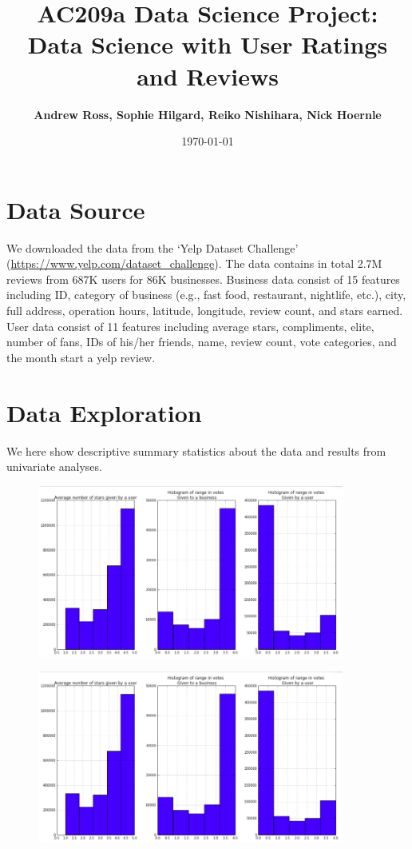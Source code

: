 \documentclass[11pt]{article}
\title{
\vspace{1cm}
\textmd{\textbf{AC209a Data Science Project: Data Science with User Ratings and Reviews}}\\
}
\author{\textbf{Andrew Ross, Sophie Hilgard, Reiko Nishihara, Nick Hoernle}}
\date{\today} %
\begin{document}
\maketitle

\section*{Data Source}
We downloaded the data from the `Yelp Dataset Challenge' (\url{https://www.yelp.com/dataset_challenge}). The data contains in total 2.7M reviews from 687K users for 86K businesses. Business data consist of 15 features including ID, category of business (e.g., fast food, restaurant, nightlife, etc.), city, full address, operation hours, latitude, longitude, review count, and stars earned. User data consist of 11 features including average stars, compliments, elite, number of fans, IDs of his/her friends, name, review count, vote categories, and the month start a yelp review. 

\section*{Data Exploration}
We here show descriptive summary statistics about the data and results from univariate analyses. 

\begin{figure}[H]
\centering
\includegraphics[width=0.9\textwidth]{./ac209/avgstarsusersbusinesses.png}
\end{figure}

\begin{figure}[H]
\centering
\includegraphics[width=0.9\textwidth]{./ac209/avgstarsusersbusinesses.png}
\end{figure}
\end{document}
